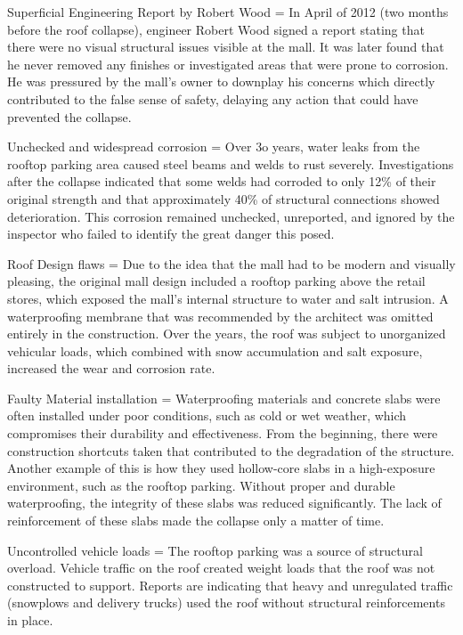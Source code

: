 \documentclass[12pt]{article}
\begin{document}
 
Superficial Engineering Report by Robert Wood = In April of 2012 (two months before the roof collapse), engineer Robert Wood signed a report stating that there were no visual structural issues visible at the mall. It was later found that he never removed any finishes or investigated areas that were prone to corrosion. He was pressured by the mall’s owner to downplay his concerns which directly contributed to the false sense of safety, delaying any action that could have prevented the collapse.

 

 
Unchecked and widespread corrosion = Over 3o years, water leaks from the rooftop parking area caused steel beams and welds to rust severely. Investigations after the collapse indicated that some welds had corroded to only 12\% of their original strength and that approximately 40\% of structural connections showed deterioration. This corrosion remained unchecked, unreported, and ignored by the inspector who failed to identify the great danger this posed.

 

 
Roof Design flaws = Due to the idea that the mall had to be modern and visually pleasing, the original mall design included a rooftop parking above the retail stores, which exposed the mall's internal structure to water and salt intrusion. A waterproofing membrane that was recommended by the architect was omitted entirely in the construction. Over the years, the roof was subject to unorganized vehicular loads, which combined with snow accumulation and salt exposure, increased the wear and corrosion rate.

 

 
Faulty Material installation = Waterproofing materials and concrete slabs were often installed under poor conditions, such as cold or wet weather, which compromises their durability and effectiveness. From the beginning, there were construction shortcuts taken that contributed to the degradation of the structure. Another example of this is how they used hollow-core slabs in a high-exposure environment, such as the rooftop parking. Without proper and durable waterproofing, the integrity of these slabs was reduced significantly. The lack of reinforcement of these slabs made the collapse only a matter of time.

 

 

 
Uncontrolled vehicle loads = The rooftop parking was a source of structural overload. Vehicle traffic on the roof created weight loads that the roof was not constructed to support. Reports are indicating that heavy and unregulated traffic (snowplows and delivery trucks) used the roof without structural reinforcements in place.
\end{document}
